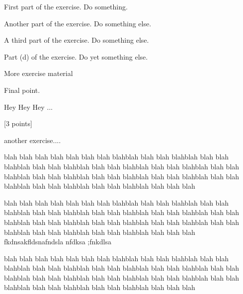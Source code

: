 \documentclass[11pt,a4paper]{article}
\begin{document}
\MakeUebungHeader

\exstarred
{}

\begin{exenumerate}
\item First part of the exercise. Do something.
\item Another part of the exercise. Do something else.
\exstarred\item A third part of the exercise. Do something else.
\item Part (d) of the exercise. Do yet something else.
\exstarred\item More exercise material
\item Final point.
\end{exenumerate}


Hey Hey Hey ...

\exstarred{}[3 points]

another exercise....


blah blah blah blah blah blah blah blahblah blah blah blahblah blah blah blahblah blah
blah blahblah blah blah blahblah blah blah blahblah blah blah blahblah blah blah blahblah
blah blah blahblah blah blah blahblah blah blah blahblah blah blah blahblah blah blah
blahblah blah blah blah

\exstarred{}

blah blah blah blah blah blah blah blahblah blah blah blahblah blah blah blahblah blah
blah blahblah blah blah blahblah blah blah blahblah blah blah blahblah blah blah blahblah
blah blah blahblah blah blah blahblah blah blah blahblah blah blah blahblah blah blah
blahblah blah blah blah
%
fkdnsakfldsnafndsla nfdksa ;fnkdlsa 


blah blah blah blah blah blah blah blahblah blah blah blahblah blah blah blahblah blah
blah blahblah blah blah blahblah blah blah blahblah blah blah blahblah blah blah blahblah
blah blah blahblah blah blah blahblah blah blah blahblah blah blah blahblah blah blah
blahblah blah blah blah
\end{document}
